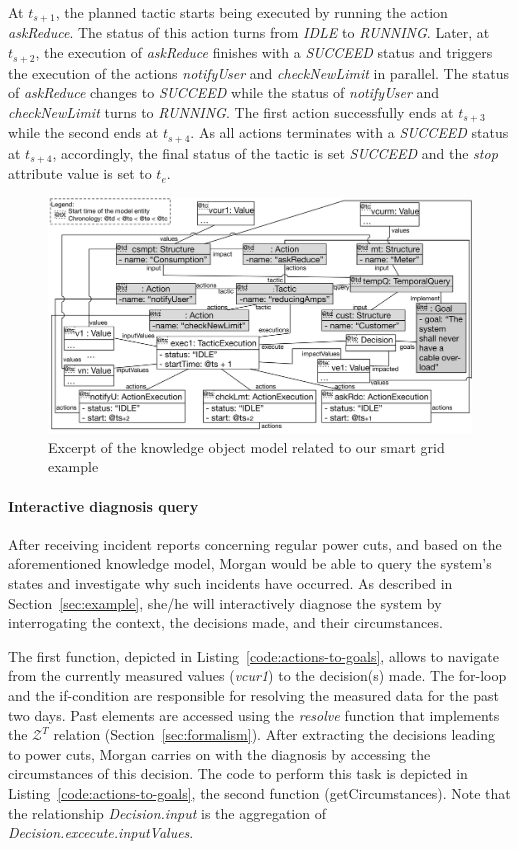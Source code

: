 At $t_{s+1}$, the planned tactic starts being executed by running the action \textit{askReduce}. The status of this action turns from \textit{IDLE} to \textit{RUNNING}. Later, at $t_{s+2}$, the execution of \textit{askReduce} finishes with a \textit{SUCCEED} status and triggers the execution of the actions \textit{notifyUser} and \textit{checkNewLimit} in parallel. The status of \textit{askReduce} changes to \textit{SUCCEED} while the status of \textit{notifyUser} and \textit{checkNewLimit} turns to \textit{RUNNING}.
The first action successfully ends at $t_{s+3}$ while the second ends at $t_{s+4}$. As all actions terminates with a \textit{SUCCEED} status at $t_{s+4}$, accordingly, the final status of the tactic is set \textit{SUCCEED} and the \textit{stop} attribute value is set to $t_{e}$.  

\begin{figure}
	\centering
	\includegraphics[width=\linewidth]{img/chapt-tkm/validation/action-om}
	\caption{Excerpt of the knowledge object model related to our smart grid example}
	\label{fig:tkm:valid:diag}
\end{figure}

\paragraph{Interactive diagnosis query}
After receiving incident reports concerning regular power cuts, and based on the aforementioned knowledge model, Morgan would be able to query the system's states and investigate why such incidents have occurred.
As described in Section~\ref{sec:example}, she/he will interactively diagnose the system by interrogating the context, the decisions made, and their circumstances.

The first function, depicted in Listing~\ref{code:actions-to-goals}, allows  to navigate from the currently measured values (\textit{vcur1}) to the decision(s) made. The for-loop and the if-condition are responsible for resolving the measured data for the past two days. 
Past elements are accessed using the \textit{resolve} function that implements the $\mathcal{Z}^T$ relation (\cf Section~\ref{sec:formalism}).
After extracting the decisions leading to power cuts, Morgan carries on with the diagnosis by accessing the circumstances of this decision. The code to perform this task is depicted in Listing~\ref{code:actions-to-goals}, the second function (getCircumstances).
Note that the relationship \textit{Decision.input} is the aggregation of \textit{Decision.excecute.inputValues}.

